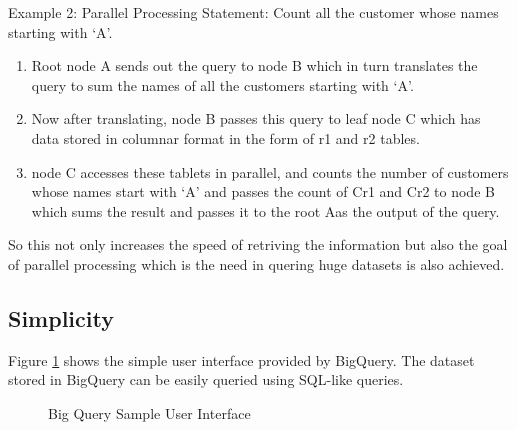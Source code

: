 \documentclass[9pt,twocolumn,twoside]{../../styles/osajnl}
\begin{document}
\noindent
Example 2: Parallel Processing \newline Statement: Count all the
customer whose names starting with ‘A’. \newline

\begin{enumerate}[noitemsep,topsep=0pt]
\item Root node A sends out the query to node B which in turn
  translates the query to sum the names of all the customers starting
  with ‘A’. \item Now after translating, node B passes this query to
  leaf node C which has data stored in columnar format in the form of
  r1 and r2 tables. \item node C accesses these tablets in parallel,
  and counts the number of customers whose names start with ‘A’ and
  passes the count of Cr1 and Cr2 to node B which sums the result and
  passes it to the root Aas the output of the query. \end{enumerate}

\noindent
So this not only increases the speed of retriving the information but
also the goal of parallel processing which is the need in quering huge
datasets is also achieved.

\subsection{Simplicity}
Figure \ref{fig:bigqueryinterface} shows the simple user interface
provided by BigQuery. The dataset stored in BigQuery can be easily
queried using SQL-like queries.

\begin{figure}[htbp]
\centering
{}
\caption{\cite{www-userinterface-bigquery} Big Query Sample User
  Interface}
\label{fig:bigqueryinterface}
\end{figure}
\end{document}
